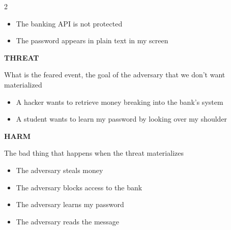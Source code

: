 \documentclass[a4paper,9pt]{extarticle}
\begin{document}
\begin{multicols}{2}
\begin{example}
\begin{itemize}
\item The banking API is not protected

\item The password appears in plain text in my screen

\end{itemize}

\end{example}


\begin{definition}

\textbf{THREAT}

What is the feared event, the goal of the
adversary that we don't want
materialized

\end{definition}


\begin{example}

\begin{itemize}

\item A hacker wants to retrieve money breaking
into the bank's system

\item A student wants to learn my password by
looking over my shoulder

\end{itemize}

\end{example}


\begin{definition}

\textbf{HARM}

The bad thing that happens when the
threat materializes

\end{definition}


\begin{example}

\begin{itemize}

\item The adversary steals money

\item The adversary blocks access to the bank

\item The adversary learns my password

\item The adversary reads the message

\end{itemize}


\end{example}
\end{multicols}
\end{document}

